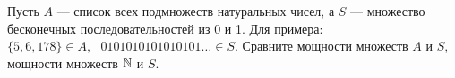 \documentclass[12pt, a4paper, oneside]{article}
\begin{document}
\begin{problem}{}
    Пусть $A$ --- список всех подмножеств натуральных чисел, а $S$ --- множество бесконечных последовательностей из 0 и 1. Для примера: $\{5,6,178\} \in A, \mbox{ } 0101010101010101 \ldots \in S$. Сравните мощности множеств $A$ и $S$, мощности множеств $\mathbb N$ и $S$.
\end{problem}

\end{document}
